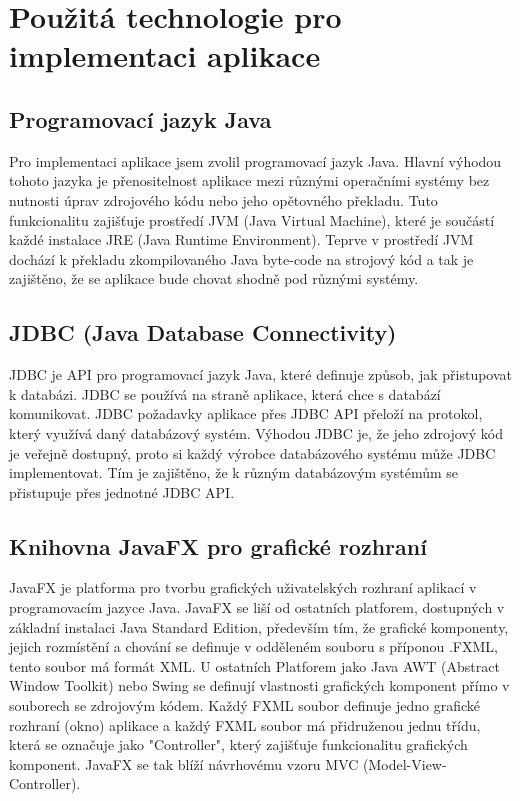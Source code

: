 \documentclass[czech,bachelor,public,dept460,male,cpdeclaration,twoside]{diploma}
\begin{document}
\section{Použitá technologie pro implementaci aplikace} \label{tech}

\subsection{Programovací jazyk Java}
Pro implementaci aplikace jsem zvolil programovací jazyk Java. Hlavní výhodou tohoto jazyka je přenositelnost aplikace mezi různými operačními systémy bez nutnosti úprav zdrojového kódu nebo jeho opětovného překladu. Tuto funkcionalitu zajišťuje prostředí JVM (Java Virtual Machine), které je součástí každé instalace JRE (Java Runtime Environment). Teprve v prostředí JVM dochází k překladu zkompilovaného Java byte-code na strojový kód a tak je zajištěno, že se aplikace bude chovat shodně pod různými systémy.

\subsection{JDBC (Java Database Connectivity)} \label{jdbc}
JDBC je API pro programovací jazyk Java, které definuje způsob, jak přistupovat k databázi. JDBC se používá na straně aplikace, která chce s databází komunikovat. JDBC požadavky aplikace přes JDBC API přeloží na protokol, který využívá daný databázový systém. Výhodou JDBC je, že jeho zdrojový kód je veřejně dostupný, proto si každý výrobce databázového systému může JDBC implementovat. Tím je zajištěno, že k různým databázovým systémům se přistupuje přes jednotné JDBC API.


\subsection{Knihovna JavaFX pro grafické rozhraní}
JavaFX je platforma pro tvorbu grafických uživatelských rozhraní aplikací v programovacím jazyce Java. JavaFX se liší od ostatních platforem, dostupných v základní instalaci Java Standard Edition, především tím, že grafické komponenty, jejich rozmístění a chování se definuje v odděleném souboru s příponou .FXML, tento soubor má formát XML. U ostatních Platforem jako Java AWT (Abstract Window Toolkit) nebo Swing se definují vlastnosti grafických komponent přímo v souborech se zdrojovým kódem. Každý FXML soubor definuje jedno grafické rozhraní (okno) aplikace a každý FXML soubor má přidruženou jednu třídu, která se označuje jako "Controller", který zajišťuje funkcionalitu grafických komponent. JavaFX se tak blíží návrhovému vzoru MVC (Model-View-Controller).
\end{document}
